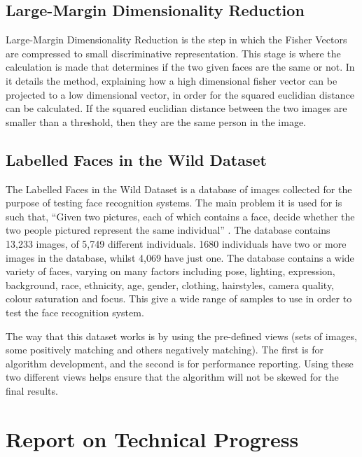 \documentclass[12pt, a4paper]{article}
\begin{document}
\subsection*{Large-Margin Dimensionality Reduction}

Large-Margin Dimensionality Reduction is the step in which the Fisher Vectors are compressed to small discriminative representation. This stage is where the calculation is made that determines if the two given faces are the same or not. In \cite{highlbpsift} it details the method, explaining how a high dimensional fisher vector can be projected to a low dimensional vector, in order for the squared euclidian distance can be calculated. If the squared euclidian distance between the two images are smaller than a threshold, then they are the same person in the image.
        
  \subsection*{Labelled Faces in the Wild Dataset}

The Labelled Faces in the Wild Dataset is a database of images collected for the purpose of testing face recognition systems. The main problem it is used for is such that, “Given two pictures, each of which contains a face, decide whether the two people pictured represent the same individual” \cite{labelledFaces}. The database contains 13,233 images, of 5,749 different individuals. 1680 individuals have two or more images in the database, whilst 4,069 have just one. The database contains a wide variety of faces, varying on many factors including pose, lighting, expression, background, race, ethnicity, age, gender, clothing, hairstyles, camera quality, colour saturation and focus. This give a wide range of samples to use in order to test the face recognition system.

The way that this dataset works is by using the pre-defined views (sets of images, some positively matching and others negatively matching). The first is for algorithm development, and the second is for performance reporting. Using these two different views helps ensure that the algorithm will not be skewed for the final results.

\section{Report on Technical Progress}
\end{document}
